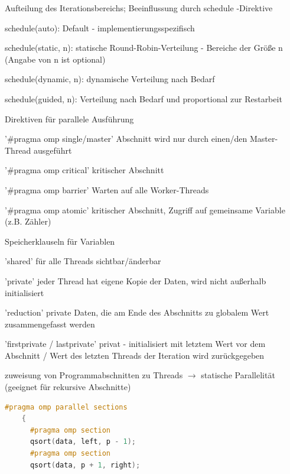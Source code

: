 \documentclass[10pt]{article}
\begin{document}
\begin{itemize*}
    \item Aufteilung des Iterationsbereichs; Beeinflussung durch schedule -Direktive
    \begin{itemize*}
      \item schedule(auto): Default - implementierungsspezifisch
      \item schedule(static, n): statische Round-Robin-Verteilung - Bereiche der Größe n (Angabe von n ist optional)
      \item schedule(dynamic, n): dynamische Verteilung nach Bedarf
      \item schedule(guided, n): Verteilung nach Bedarf und proportional zur Restarbeit
    \end{itemize*}
    \item Direktiven für parallele Ausführung
    \begin{itemize*}
      \item '\#pragma omp single/master' Abschnitt wird nur durch einen/den Master-Thread ausgeführt
      \item '\#pragma omp critical' kritischer Abschnitt
      \item '\#pragma omp barrier' Warten auf alle Worker-Threads
      \item '\#pragma omp atomic' kritischer Abschnitt, Zugriff auf gemeinsame Variable (z.B. Zähler)
    \end{itemize*}
    \item Speicherklauseln für Variablen
    \begin{itemize*}
      \item 'shared' für alle Threads sichtbar/änderbar
      \item 'private' jeder Thread hat eigene Kopie der Daten, wird nicht außerhalb initialisiert
      \item 'reduction' private Daten, die am Ende des Abschnitts zu globalem Wert zusammengefasst werden
      \item 'firstprivate / lastprivate' privat - initialisiert mit letztem Wert vor dem Abschnitt / Wert des letzten Threads der Iteration wird zurückgegeben
    \end{itemize*}
    \item zuweisung von Programmabschnitten zu Threads $\rightarrow$ statische Parallelität (geeignet für rekursive Abschnitte)
    \begin{lstlisting}[language=C++]
    #pragma omp parallel sections
    {
      #pragma omp section
      qsort(data, left, p - 1);
      #pragma omp section
      qsort(data, p + 1, right);

\end{lstlisting}
\end{itemize*}
\end{document}
